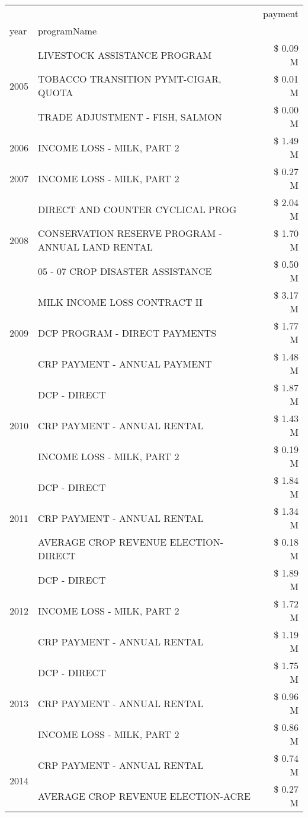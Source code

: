 \begin{tabular}{llr}
\toprule
 &  & payment \\
year & programName &  \\
\midrule
\multirow[t]{3}{*}{2005} & LIVESTOCK ASSISTANCE PROGRAM & \$ 0.09 M \\
 & TOBACCO TRANSITION PYMT-CIGAR, QUOTA & \$ 0.01 M \\
 & TRADE ADJUSTMENT - FISH, SALMON & \$ 0.00 M \\
\cline{1-3}
2006 & INCOME LOSS - MILK, PART 2 & \$ 1.49 M \\
\cline{1-3}
2007 & INCOME LOSS - MILK, PART 2 & \$ 0.27 M \\
\cline{1-3}
\multirow[t]{3}{*}{2008} & DIRECT AND COUNTER CYCLICAL PROG & \$ 2.04 M \\
 & CONSERVATION RESERVE PROGRAM - ANNUAL LAND RENTAL & \$ 1.70 M \\
 & 05 - 07 CROP DISASTER ASSISTANCE & \$ 0.50 M \\
\cline{1-3}
\multirow[t]{3}{*}{2009} & MILK INCOME LOSS CONTRACT II & \$ 3.17 M \\
 & DCP PROGRAM - DIRECT PAYMENTS & \$ 1.77 M \\
 & CRP PAYMENT - ANNUAL PAYMENT & \$ 1.48 M \\
\cline{1-3}
\multirow[t]{3}{*}{2010} & DCP - DIRECT & \$ 1.87 M \\
 & CRP PAYMENT - ANNUAL RENTAL & \$ 1.43 M \\
 & INCOME LOSS - MILK, PART 2 & \$ 0.19 M \\
\cline{1-3}
\multirow[t]{3}{*}{2011} & DCP - DIRECT & \$ 1.84 M \\
 & CRP PAYMENT - ANNUAL RENTAL & \$ 1.34 M \\
 & AVERAGE CROP REVENUE ELECTION-DIRECT & \$ 0.18 M \\
\cline{1-3}
\multirow[t]{3}{*}{2012} & DCP - DIRECT & \$ 1.89 M \\
 & INCOME LOSS - MILK, PART 2 & \$ 1.72 M \\
 & CRP PAYMENT - ANNUAL RENTAL & \$ 1.19 M \\
\cline{1-3}
\multirow[t]{3}{*}{2013} & DCP - DIRECT & \$ 1.75 M \\
 & CRP PAYMENT - ANNUAL RENTAL & \$ 0.96 M \\
 & INCOME LOSS - MILK, PART 2 & \$ 0.86 M \\
\cline{1-3}
\multirow[t]{3}{*}{2014} & CRP PAYMENT - ANNUAL RENTAL & \$ 0.74 M \\
 & AVERAGE CROP REVENUE ELECTION-ACRE & \$ 0.27 M \\

\end{tabular}
